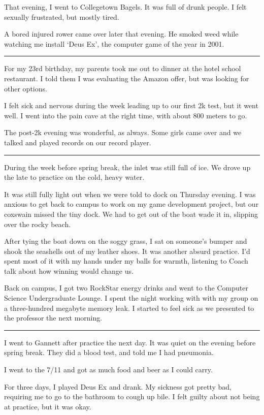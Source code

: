 That evening, I went to Collegetown Bagels.  It was full of drunk people.  I
felt sexually frustrated, but mostly tired.  

A bored injured rower came over later that evening.  He smoked weed while
watching me install `Deus Ex', the computer game of the year in 2001. 

\plainfancybreak{12pt}{2}{}

For my 23rd birthday, my parents took me out to dinner at the hotel school
restaurant.  I told them I was evaluating the Amazon offer, but was looking for
other options.

I felt sick and nervous during the week leading up to our first 2k test, but it
went well.  I went into the pain cave at the right time, with about 800 meters
to go.  

The post-2k evening was wonderful, as always.  Some girls came over and we
talked and played records on our record player.  

\plainfancybreak{12pt}{2}{}

During the week before spring break, the inlet was still full of ice.  We drove
up the late to practice on the cold, heavy water. 

It was still fully light out when we were told to dock on Thursday evening.  I
was anxious to get back to campus to work on my game development project, but
our coxswain missed the tiny dock.  We had to get out of the boat wade it in,
slipping over the rocky beach.

After tying the boat down on the soggy grass, I sat on someone's bumper and
shook the seashells out of my leather shoes.  It was another absurd practice.
I'd spent most of it with my hands under my balls for warmth, listening to Coach
talk about how winning would change us.  

Back on campus, I got two RockStar energy drinks and went to the Computer
Science Undergraduate Lounge.  I spent the night working with with my group on a
three-hundred megabyte memory leak.  I started to feel sick as we presented to
the professor the next morning.

\plainfancybreak{12pt}{2}{}

I went to Gannett after practice the next day.  It was quiet on the evening
before spring break.  They did a blood test, and told me I had pneumonia.

I went to the 7/11 and got as much food and beer as I could carry.  

For three days, I played Deus Ex and drank.  My sickness got pretty bad,
requiring me to go to the bathroom to cough up bile.  I felt guilty about not
being at practice, but it was okay.   

